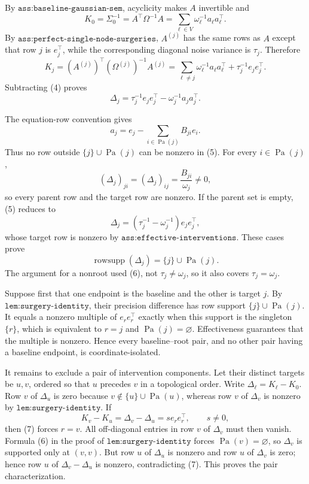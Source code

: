 By \(\texttt{ass:baseline-gaussian-sem}\), acyclicity makes \(A\)
invertible and
\[
 K_0=\Sigma_0^{-1}=A^{\top}\Omega^{-1}A
     =\sum_{\ell\in V}\omega_\ell^{-1}a_\ell a_\ell^{\top}.          \tag{4}
\]
By \(\texttt{ass:perfect-single-node-surgeries}\), \(A^{(j)}\) has the
same rows as \(A\) except that row \(j\) is \(e_j^{\top}\), while the
corresponding diagonal noise variance is \(\tau_j\).  Therefore
\[
 K_j=(A^{(j)})^{\top}(\Omega^{(j)})^{-1}A^{(j)}
 =\sum_{\ell\neq j}\omega_\ell^{-1}a_\ell a_\ell^{\top}
  +\tau_j^{-1}e_je_j^{\top}.
\]
Subtracting (4) proves
\[
 \Delta_j
 =\tau_j^{-1}e_je_j^{\top}
  -\omega_j^{-1}a_ja_j^{\top}.                                    \tag{5}
\]

The equation-row convention gives
\[
 a_j=e_j-\sum_{i\in\operatorname{Pa}(j)}B_{ji}e_i.
\]
Thus no row outside \(\{j\}\cup\operatorname{Pa}(j)\) can be nonzero in
(5).  For every \(i\in\operatorname{Pa}(j)\),
\[
 (\Delta_j)_{ji}=(\Delta_j)_{ij}=\frac{B_{ji}}{\omega_j}\neq0,       \tag{6}
\]
so every parent row and the target row are nonzero.  If the parent set is
empty, (5) reduces to
\[
 \Delta_j=(\tau_j^{-1}-\omega_j^{-1})e_je_j^{\top},
\]
whose target row is nonzero by
\(\texttt{ass:effective-interventions}\).  These cases prove
\[
 \operatorname{rowsupp}(\Delta_j)
 =\{j\}\cup\operatorname{Pa}(j).
\]
The argument for a nonroot used (6), not
\(\tau_j\neq\omega_j\), so it also covers \(\tau_j=\omega_j\).

Suppose first that one endpoint is the baseline and the other is target
\(j\).  By \(\texttt{lem:surgery-identity}\), their precision difference
has row support \(\{j\}\cup\operatorname{Pa}(j)\).  It equals a nonzero
multiple of \(e_re_r^{\top}\) exactly when this support is the singleton
\(\{r\}\), which is equivalent to \(r=j\) and
\(\operatorname{Pa}(j)=\varnothing\).  Effectiveness guarantees that the
multiple is nonzero.  Hence every baseline--root pair, and no other pair
having a baseline endpoint, is coordinate-isolated.

It remains to exclude a pair of intervention components.  Let their
distinct targets be \(u,v\), ordered so that \(u\) precedes \(v\) in a
topological order.  Write \(\Delta_\ell=K_\ell-K_0\).  Row \(v\) of
\(\Delta_u\) is zero because \(v\notin\{u\}\cup\operatorname{Pa}(u)\),
whereas row \(v\) of \(\Delta_v\) is nonzero by
\(\texttt{lem:surgery-identity}\).  If
\[
 K_v-K_u=\Delta_v-\Delta_u=s e_re_r^{\top},\qquad s\neq0,            \tag{7}
\]
then (7) forces \(r=v\).  All off-diagonal entries in row \(v\) of
\(\Delta_v\) must then vanish.  Formula (6) in the proof of
\(\texttt{lem:surgery-identity}\) forces
\(\operatorname{Pa}(v)=\varnothing\), so \(\Delta_v\) is supported only
at \((v,v)\).  But row \(u\) of \(\Delta_u\) is nonzero and row \(u\) of
\(\Delta_v\) is zero; hence row \(u\) of \(\Delta_v-\Delta_u\) is
nonzero, contradicting (7).  This proves the pair characterization.

